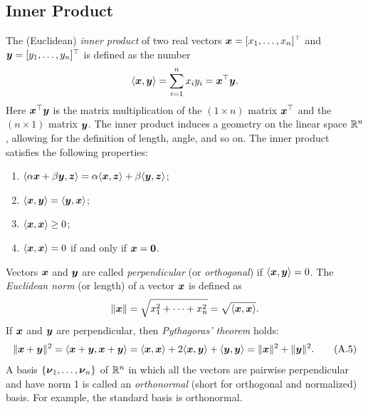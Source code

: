 \subsection{Inner Product}
The (Euclidean) \textit{inner product} of two real vectors \(\boldsymbol{x} = [x_1, \dots, x_n]^\top\) and \(\boldsymbol{y} = [y_1, \dots, y_n]^\top\) is defined as the number
\begin{equation*}
	\langle \boldsymbol{x}, \boldsymbol{y} \rangle = \sum_{i=1}^n x_i y_i = \boldsymbol{x}^\top \boldsymbol{y}.
\end{equation*}
Here \(\boldsymbol{x}^\top \boldsymbol{y}\) is the matrix multiplication of the \((1 \times n)\) matrix \(\boldsymbol{x}^\top\) and the \((n \times 1)\) matrix \(\boldsymbol{y}\). The inner product induces a geometry on the linear space \(\mathbb{R}^n\), allowing for the definition of length, angle, and so on. The inner product satisfies the following properties:
\begin{enumerate}
	\item \(\langle \alpha \boldsymbol{x} + \beta \boldsymbol{y}, \boldsymbol{z} \rangle = \alpha \langle \boldsymbol{x}, \boldsymbol{z} \rangle + \beta \langle \boldsymbol{y}, \boldsymbol{z} \rangle\);
	\item \(\langle \boldsymbol{x}, \boldsymbol{y} \rangle = \langle \boldsymbol{y}, \boldsymbol{x} \rangle\);
	\item \(\langle \boldsymbol{x}, \boldsymbol{x} \rangle \ge 0\);
	\item \(\langle \boldsymbol{x}, \boldsymbol{x} \rangle = 0\) if and only if \(\boldsymbol{x} = \boldsymbol{0}\).
\end{enumerate}
Vectors \(\boldsymbol{x}\) and \(\boldsymbol{y}\) are called \textit{perpendicular} (or \textit{orthogonal}) if \(\langle \boldsymbol{x}, \boldsymbol{y} \rangle = 0\). The \textit{Euclidean norm} (or length) of a vector \(\boldsymbol{x}\) is defined as
\begin{equation*}
	\|\boldsymbol{x}\| = \sqrt{x_1^2 + \dots + x_n^2} = \sqrt{\langle \boldsymbol{x}, \boldsymbol{x} \rangle}.
\end{equation*}
If \(\boldsymbol{x}\) and \(\boldsymbol{y}\) are perpendicular, then \textit{Pythagoras' theorem} holds:
\begin{equation}
	\|\boldsymbol{x} + \boldsymbol{y}\|^2 = \langle \boldsymbol{x} + \boldsymbol{y}, \boldsymbol{x} + \boldsymbol{y} \rangle = \langle \boldsymbol{x}, \boldsymbol{x} \rangle + 2 \langle \boldsymbol{x}, \boldsymbol{y} \rangle + \langle \boldsymbol{y}, \boldsymbol{y} \rangle = \|\boldsymbol{x}\|^2 + \|\boldsymbol{y}\|^2. \tag{A.5}
\end{equation}
A basis \(\{\boldsymbol{\nu}_1, \dots, \boldsymbol{\nu}_n\}\) of \(\mathbb{R}^n\) in which all the vectors are pairwise perpendicular and have norm 1 is called an \textit{orthonormal} (short for orthogonal and normalized) basis. For example, the standard basis is orthonormal.

